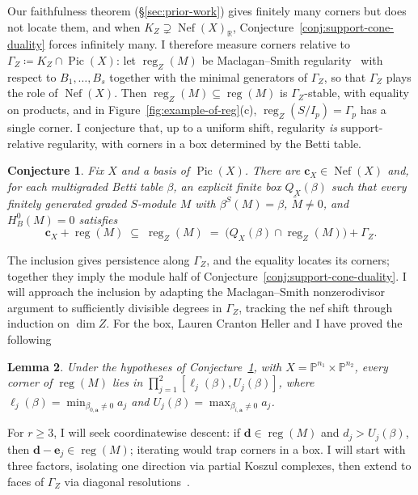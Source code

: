 \documentclass[11pt,reqno]{amsart}
\newtheorem{lemma}{Lemma}[section]
\newtheorem{conjecture}[lemma]{Conjecture}
\theoremstyle{remark}
\newcommand{\reg}{\operatorname{reg}}
\newcommand{\Pic}{\operatorname{Pic}}
\newcommand{\Nef}{\operatorname{Nef}}
\renewcommand{\aa}{\mathbf{a}}
\newcommand{\dd}{\mathbf{d}}
\newcommand{\PP}{\mathbb{P}}
\newcommand{\RR}{\mathbb{R}}
\begin{document}
Our faithfulness theorem (\S\ref{sec:prior-work}) gives finitely many corners but does not locate them, and when $K_Z\supsetneq\Nef(X)_{\RR}$, Conjecture~\ref{conj:support-cone-duality} forces infinitely many. I therefore measure corners relative to $\Gamma_Z\coloneqq K_Z\cap\Pic(X)$: let $\reg_Z(M)$ be Maclagan--Smith regularity~\cite{maclaganSmith04} with respect to $B_1,\ldots,B_s$ together with the minimal generators of $\Gamma_Z$, so that $\Gamma_Z$ plays the role of $\Nef(X)$. Then $\reg_Z(M)\subseteq\reg(M)$ is $\Gamma_Z$-stable, with equality on products, and in Figure~\ref{fig:example-of-reg}(c), $\reg_Z(S/I_p)=\Gamma_p$ has a single corner. I conjecture that, up to a uniform shift, regularity \emph{is} support-relative regularity, with corners in a box determined by the Betti table.

\begin{conjecture}\label{conj:betti-boxes}
Fix $X$ and a basis of $\Pic(X)$. There are $\mathbf c_X\in\Nef(X)$ and, for each multigraded Betti table $\beta$, an explicit finite box $Q_X(\beta)$ such that every finitely generated graded $S$-module $M$ with $\beta^S(M)=\beta$, $\widetilde M\ne0$, and $H_B^0(M)=0$ satisfies
\[
\mathbf c_X+\reg(M)\;\subseteq\;\reg_Z(M)\;=\;\big(Q_X(\beta)\cap\reg_Z(M)\big)+\Gamma_Z.
\]
\end{conjecture}
The inclusion gives persistence along $\Gamma_Z$, and the equality locates its corners; together they imply the module half of Conjecture~\ref{conj:support-cone-duality}. I will approach the inclusion by adapting the Maclagan--Smith nonzerodivisor argument to sufficiently divisible degrees in $\Gamma_Z$, tracking the nef shift through induction on $\dim Z$. For the box, Lauren Cranton Heller and I have proved the following

\begin{lemma}\label{lem:bigraded-betti-box}
Under the hypotheses of Conjecture~\ref{conj:betti-boxes},
with $X=\PP^{n_1}\times\PP^{n_2}$, every corner of $\reg(M)$
lies in $\prod_{j=1}^2[\ell_j(\beta),U_j(\beta)]$, where
$\ell_j(\beta)=\min_{\beta_{0,\aa}\ne0}a_j$ and
$U_j(\beta)=\max_{\beta_{i,\aa}\ne0}a_j$.
\end{lemma}

For $r\ge3$, I will seek coordinatewise descent: if $\dd\in\reg(M)$ and $d_j>U_j(\beta)$, then $\dd-\mathbf e_j\in\reg(M)$; iterating would trap corners in a box. I will start with three factors, isolating one direction via partial Koszul complexes, then extend to faces of $\Gamma_Z$ via diagonal resolutions~\cite{botbolChardin17,chardinHolanda22,HHL24,brownSayrafi24}.
\end{document}
